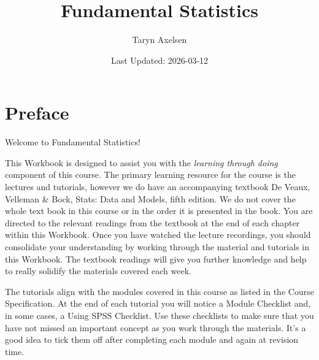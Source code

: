 \documentclass[
]{book}
\title{Fundamental Statistics}
\author{Taryn Axelsen}
\date{Last Updated: 2026-03-12}
\begin{document}
\maketitle

{
\setcounter{tocdepth}{1}
\tableofcontents
}
\newcommand{\cms}{\,\text{cm}}
\newcommand{\dLs}{\,\text{dL}}
\newcommand{\xdLs}{\text{dL}}

\newcommand{\fmols}{\,\text{fmol}}
\newcommand{\ft}{\,\text{ft}}
\newcommand{\gs}{\,\text{g}}
\newcommand{\hs}{\,\text{h}}
\newcommand{\xhs}{\text{h}}

\newcommand{\has}{\,\text{ha}}
\newcommand{\xhas}{\text{ha}}

\newcommand{\inches}{\,\text{inches}}
\newcommand{\kgs}{\,\text{kg}}
\newcommand{\kms}{\,\text{km}}
\newcommand{\kWhs}{\,\text{kWh}}
\newcommand{\lbs}{\,\text{lb}}
\newcommand{\Ls}{\,\text{L}}
\newcommand{\xLs}{\text{L}}

\frontmatter

\chapter*{Preface}\label{preface}

Welcome to Fundamental Statistics!

This Workbook is designed to assist you with the \emph{learning through doing} component of this course. The primary learning resource for the course is the lectures and tutorials, however we do have an accompanying textbook De Veaux, Velleman \& Bock,
Stats: Data and Models, fifth edition. We do not cover the whole text book in this
course or in the order it is presented in the book. You are directed to the relevant
readings from the textbook at the end of each chapter within this Workbook. Once
you have watched the lecture recordings, you should consolidate your understanding
by working through the material and tutorials in this Workbook. The textbook
readings will give you further knowledge and help to really solidify the materials
covered each week.

The tutorials align with the modules covered in this course as listed in the Course
Specification. At the end of each tutorial you will notice a Module Checklist and, in
some cases, a Using SPSS Checklist. Use these checklists to make sure that you have
not missed an important concept as you work through the materials. It's a good idea
to tick them off after completing each module and again at revision time.
\end{document}
